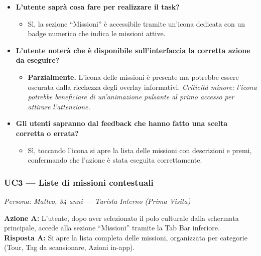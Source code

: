 \begin{itemize}[nosep, leftmargin=1.6em]
    \item \textbf{L'utente saprà cosa fare per realizzare il task?}
    \begin{itemize}[nosep, leftmargin=1.6em]
        \item Sì, la sezione ``Missioni'' è accessibile tramite un'icona dedicata con un badge numerico che indica le missioni attive.
    \end{itemize}
    \item \textbf{L'utente noterà che è disponibile sull'interfaccia la corretta azione da eseguire?}
    \begin{itemize}[nosep, leftmargin=1.6em]
        \item \textbf{Parzialmente.} L'icona delle missioni è presente ma potrebbe essere oscurata dalla ricchezza degli overlay informativi. \textit{Criticità minore: l'icona potrebbe beneficiare di un'animazione pulsante al primo accesso per attirare l'attenzione.}
    \end{itemize}
    \item \textbf{Gli utenti sapranno dal feedback che hanno fatto una scelta corretta o errata?}
    \begin{itemize}[nosep, leftmargin=1.6em]
        \item Sì, toccando l'icona si apre la lista delle missioni con descrizioni e premi, confermando che l'azione è stata eseguita correttamente.
    \end{itemize}
\end{itemize}

\vspace{0.5cm}
\subsubsection{UC3 --- Liste di missioni contestuali}
\textit{Persona: Matteo, 34 anni --- Turista Interno (Prima Visita)}

\vspace{0.3cm}

\noindent\textbf{Azione A:} L'utente, dopo aver selezionato il polo culturale dalla schermata principale, accede alla sezione ``Missioni'' tramite la Tab Bar inferiore.\\
\textbf{Risposta A:} Si apre la lista completa delle missioni, organizzata per categorie (Tour, Tag da scansionare, Azioni in-app).

